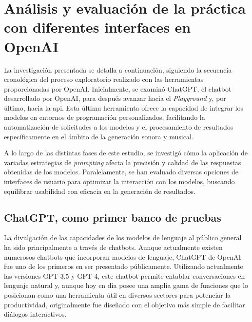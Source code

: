 
\chapter{Análisis y evaluación de la práctica con diferentes interfaces en OpenAI}
\label{chap:interfaces_openai}



La investigación presentada se detalla a continuación, siguiendo la secuencia cronológica del proceso exploratorio realizado con las herramientas proporcionadas por OpenAI. Inicialmente, se examinó ChatGPT, el chatbot desarrollado por OpenAI, para después avanzar hacia el \emph{Playground} y, por último, hacia la \gls{api}. Esta última herramienta ofrece la capacidad de integrar los modelos en entornos de programación personalizados, facilitando la automatización de solicitudes a los modelos y el procesamiento de resultados específicamente en el ámbito de la generación sonora y musical.

A lo largo de las distintas fases de este estudio, se investigó cómo la aplicación de variadas estrategias de \emph{prompting} afecta la precisión y calidad de las respuestas obtenidas de los modelos. Paralelamente, se han evaluado diversas opciones de interfaces de usuario para optimizar la interacción con los modelos, buscando equilibrar usabilidad con eficacia en la generación de resultados.

\section{ChatGPT, como primer banco de pruebas}
La divulgación de las capacidades de los modelos de lenguaje al público general ha sido principalmente a través de chatbots. Aunque actualmente existen numerosos chatbots que incorporan modelos de lenguaje, ChatGPT de OpenAI fue uno de los primeros en ser presentado públicamente. Utilizando actualmente las versiones GPT-3.5 y GPT-4, este chatbot permite entablar conversaciones en lenguaje natural y, aunque hoy en día posee una amplia gama de funciones que lo posicionan como una herramienta útil en diversos sectores para potenciar la productividad, originalmente fue diseñado con el objetivo más simple de facilitar diálogos interactivos.

